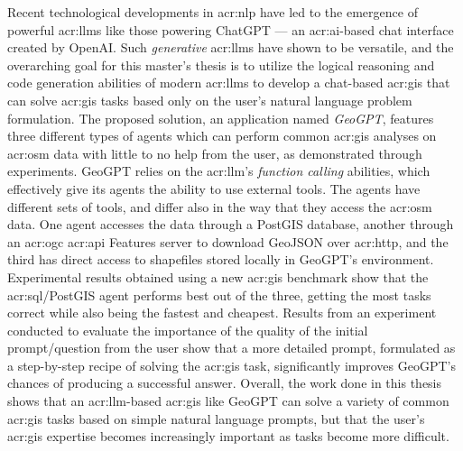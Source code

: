 Recent technological developments in \acrlong{acr:nlp} have led to the emergence of powerful \glspl{acr:llm} like those powering ChatGPT --- an \acrshort{acr:ai}-based chat interface created by OpenAI. Such \textit{generative} \glspl{acr:llm} have shown to be versatile, and the overarching goal for this master's thesis is to utilize the logical reasoning and code generation abilities of modern \glspl{acr:llm} to develop a chat-based \acrshort{acr:gis} that can solve \acrshort{acr:gis} tasks based only on the user's natural language problem formulation. The proposed solution, an application named \textit{GeoGPT}, features three different types of agents which can perform common \acrshort{acr:gis} analyses on \gls{acr:osm} data with little to no help from the user, as demonstrated through experiments. GeoGPT relies on the \acrshort{acr:llm}'s \textit{function calling} abilities, which effectively give its agents the ability to use external tools. The agents have different sets of tools, and differ also in the way that they access the \gls{acr:osm} data. One agent accesses the data through a PostGIS database, another through an \acrshort{acr:ogc} \acrshort{acr:api} Features server to download GeoJSON over \acrshort{acr:http}, and the third has direct access to shapefiles stored locally in GeoGPT's environment. Experimental results obtained using a new \acrshort{acr:gis} benchmark show that the \acrshort{acr:sql}/PostGIS agent performs best out of the three, getting the most tasks correct while also being the fastest and cheapest. Results from an experiment conducted to evaluate the importance of the quality of the initial prompt/question from the user show that a more detailed prompt, formulated as a step-by-step recipe of solving the \acrshort{acr:gis} task, significantly improves GeoGPT's chances of producing a successful answer. Overall, the work done in this thesis shows that an \acrshort{acr:llm}-based \acrshort{acr:gis} like GeoGPT can solve a variety of common \acrshort{acr:gis} tasks based on simple natural language prompts, but that the user's \acrshort{acr:gis} expertise becomes increasingly important as tasks become more difficult.



\glsresetall

